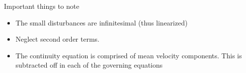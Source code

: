 Important things to note
\begin{itemize}
	\item The small disturbances are infinitesimal (thus linearized)
	\item Neglect second order terms.
	\item The continuity equation is comprised of mean velocity components. This is subtracted off in each of the governing equations
\end{itemize}


